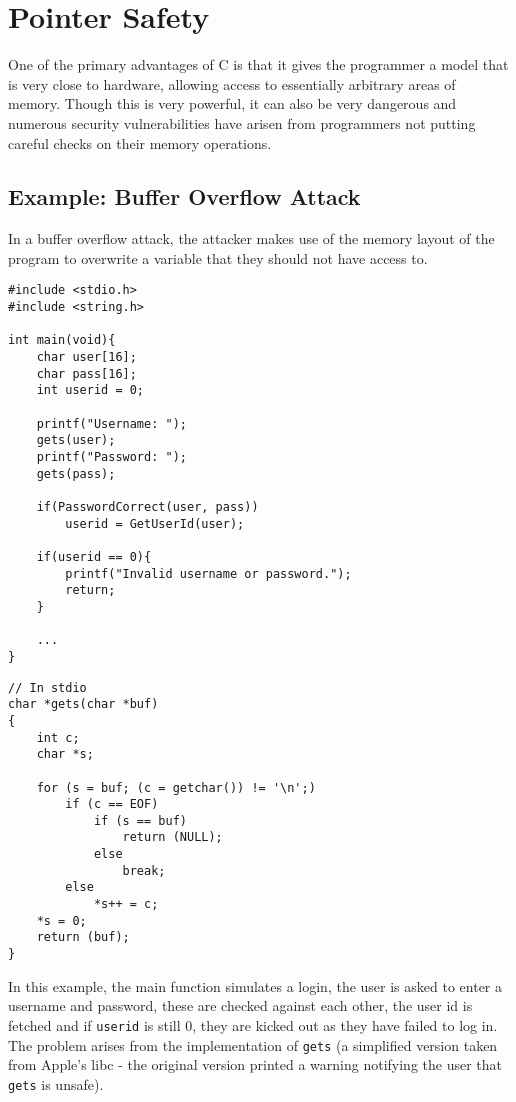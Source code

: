 \section{Pointer Safety}

One of the primary advantages of C is that it gives the programmer a model that is very close to hardware, allowing access to essentially arbitrary areas of memory.
Though this is very powerful, it can also be very dangerous and numerous security vulnerabilities have arisen from programmers not putting careful checks on their memory operations.

\subsection{Example: Buffer Overflow Attack}

In a buffer overflow attack, the attacker makes use of the memory layout of the program to overwrite a variable that they should not have access to.

\begin{verbatim}
#include <stdio.h>
#include <string.h>

int main(void){
    char user[16];
    char pass[16];
    int userid = 0;

    printf("Username: ");
    gets(user);
    printf("Password: ");
    gets(pass);

    if(PasswordCorrect(user, pass))
        userid = GetUserId(user);

    if(userid == 0){
        printf("Invalid username or password.");
        return;
    }

    ...
}
\end{verbatim}

\begin{verbatim}
// In stdio
char *gets(char *buf)
{
    int c;
    char *s;

    for (s = buf; (c = getchar()) != '\n';)
        if (c == EOF)
            if (s == buf)
                return (NULL);
            else
                break;
        else
            *s++ = c;
    *s = 0;
    return (buf);
}
\end{verbatim}

In this example, the main function simulates a login, the user is asked to enter a username and password, these are checked against each other, the user id is fetched and if \verb!userid! is still 0, they are kicked out as they have failed to log in.
The problem arises from the implementation of \verb!gets! (a simplified version taken from Apple's libc - the original version printed a warning notifying the user that \verb!gets! is unsafe).

